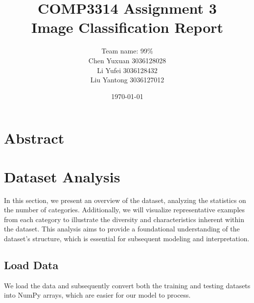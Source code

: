 \documentclass[a4paper,11pt]{article}
\begin{document}
\title{COMP3314 Assignment 3 \\ Image Classification Report}
\author{
    Team name: 99\% \\
    \vspace{0.5cm} 
    Chen Yuxuan 3036128028\\
    Li Yufei 3036128432\\
    Liu Yantong 3036127012
}
\date{\today}

\maketitle
\newpage
\tableofcontents
\newpage
\section*{Abstract}


\section{Dataset Analysis}
In this section, we present an overview of the dataset, analyzing the statistics on the number of categories. Additionally, we will visualize representative examples from each category to illustrate the diversity and characteristics inherent within the dataset. This analysis aims to provide a foundational understanding of the dataset's structure, which is essential for subsequent modeling and interpretation.

\subsection{Load Data}
We load the data and subsequently convert both the training and testing datasets into NumPy arrays, which are easier for our model to process.
\end{document}
